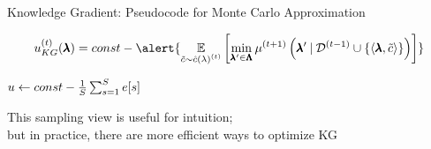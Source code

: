 \begin{frame}[c]{Knowledge Gradient: Pseudocode for Monte Carlo Approximation}

\[\iter{\acq}_{KG}(\conf) = const - \alert{
\E_{\tilde{\cost} \sim \iter[\bocount]{\surro(\lambda)}}
        \left[\min_{\conf'\in\pcs}\iter[\bocount+1]{\mean}\left(\conf'\given{\iter[\bocount-1]{\dataset} \cup \left\{\left\langle\conf, \tilde{\cost} \right\rangle \right\}}\right)\right]
}\]

\begin{center}
\begin{minipage}{0.75\textwidth}
\begin{algorithm}[H]
    \LinesNumbered
    \setcounter{AlgoLine}{0}
    
    

    $u\leftarrow const - \frac{1}{S} \sum_{s=1}^S e[s]$\;

    \caption*{Sampling Based Knowledge Gradient Acquisition Function}
\end{algorithm}
\end{minipage}

\fhpause
\bigskip
This sampling view is useful for intuition;\\ but in practice, there are more efficient ways to optimize KG 

\end{center}

\end{frame}

